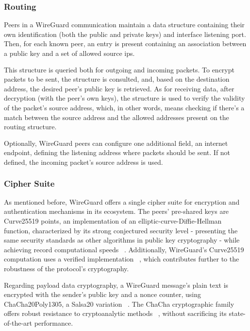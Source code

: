 \documentclass[11pt,twoside,a4paper]{report}
\begin{document}
\subsubsection{Routing}

Peers in a WireGuard communication maintain a data structure containing their own identification (both the public and private keys) and interface listening port. Then, for each known peer, an entry is present containing an association between a public key and a set of allowed source ips.

This structure is queried both for outgoing and incoming packets. To encrypt packets to be sent, the structure is consulted, and, based on the destination address, the desired peer's public key is retrieved. As for receiving data, after decryption (with the peer's own keys), the structure is used to verify the validity of the packet's source address, which, in other words, means checking if there's a match between the source address and the allowed addresses present on the routing structure.

Optionally, WireGuard peers can configure one additional field, an internet endpoint, defining the listening address where packets should be sent. If not defined, the incoming packet's source address is used.

\subsubsection{Cipher Suite}

As mentioned before, WireGuard offers a single cipher suite for encryption and authentication mechanisms in its ecosystem. The peers' pre-shared keys are Curve25519 points, an implementation of an elliptic-curve-Diffie-Hellman function, characterized by its strong conjectured security level - presenting the same security standards as other algorithms in public key cryptography - while achieving record computational speeds ~\cite{bernstein2006curve25519}. Additionally, WireGuard's Curve25519 computation uses a verified implementation ~\cite{zinzindohoue2017hacl}, which contributes further to the robustness of the protocol's cryptography.

Regarding payload data cryptography, a WireGuard message's plain text is encrypted with the sender's public key and a nonce counter, using ChaCha20Poly1305, a Salsa20 variation ~\cite{bernstein2008chacha}. The ChaCha cryptographic family offers robust resistance to cryptoanalytic methods ~\cite{cryptoeprint:2014/613}, without sacrificing its state-of-the-art performance.
\end{document}
